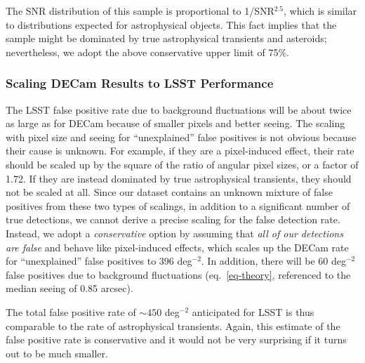 The SNR distribution of this sample is proportional to 1/SNR$^{2.5}$, which
is similar to distributions expected for astrophysical objects. This fact implies
that the sample might be dominated by true astrophysical transients and
asteroids; nevertheless, we adopt the above conservative upper limit of 75\%.


\subsubsection{Scaling DECam Results to LSST Performance}

The LSST false positive rate due to background fluctuations will be about twice
as large as for DECam because of smaller pixels and better seeing. The scaling
with pixel size and seeing for ``unexplained'' false positives is not obvious
because their cause is unknown. For example, if they are a pixel-induced effect,
their rate should be scaled up by the square of the ratio of angular pixel sizes, or
a factor of 1.72. If they are instead dominated by true astrophysical transients, 
they should not be scaled at all. Since our dataset contains an unknown 
mixture of false positives from these two types of scalings, in addition to a 
significant number of true detections, we cannot derive a precise scaling for the 
false detection rate. Instead, we adopt a {\it conservative} option by assuming
that {\it all of our detections are false} and behave like pixel-induced effects, 
which scales up the DECam rate for ``unexplained'' false positives to 396 deg$^{-2}$. 
In addition, there will be 60 deg$^{-2}$ false positives due to background fluctuations 
(eq.~\ref{eq-theory}, referenced to the median seeing of 0.85 arcsec).

The total false positive rate of $\sim450$ deg$^{-2}$ anticipated for LSST is thus
comparable to the rate of astrophysical transients. Again, this estimate of the false
positive rate is conservative and it would not be very surprising if it turns out
to be much smaller.

